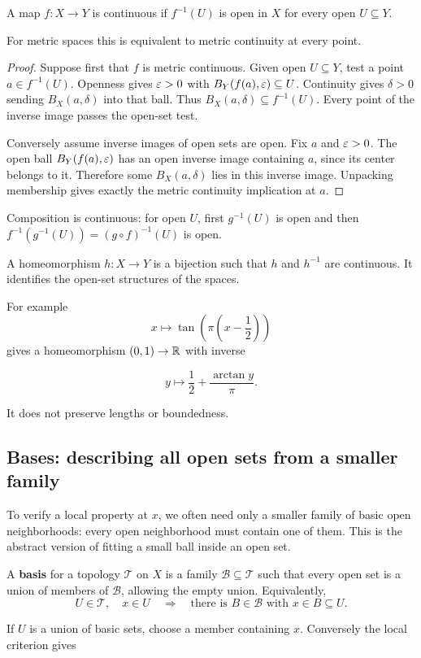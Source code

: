\begin{definition}\label{def:topological-continuity}
A map $f:X\to Y$ is continuous if $f^{-1}(U)$ is open in $X$ for every
open $U\subseteq Y$.
\end{definition}
\begin{theorem}\label{thm:topological-continuity}
For metric spaces this is equivalent to metric continuity at every point.
\end{theorem}
\begin{proof}
Suppose first that $f$ is metric continuous. Given open $U\subseteq Y$,
test a point $a\in f^{-1}(U)$. Openness gives $\varepsilon>0$ with
$B_Y(f(a),\varepsilon)\subseteq U$. Continuity gives $\delta>0$ sending
$B_X(a,\delta)$ into that ball. Thus $B_X(a,\delta)\subseteq f^{-1}(U)$.
Every point of the inverse image passes the open-set test.

Conversely assume inverse images of open sets are open. Fix $a$ and
$\varepsilon>0$. The open ball $B_Y(f(a),\varepsilon)$ has an open inverse image
containing $a$, since its center belongs to it. Therefore some
$B_X(a,\delta)$ lies in this inverse image. Unpacking membership gives
exactly the metric continuity implication at $a$.
\end{proof}
Composition is continuous: for open $U$, first $g^{-1}(U)$ is open and
then $f^{-1}(g^{-1}(U))=(g\circ f)^{-1}(U)$ is open.
\begin{definition}[Homeomorphisms]\label{def:homeomorphism}
A homeomorphism $h:X\to Y$ is a bijection such that $h$ and $h^{-1}$
are continuous. It identifies the open-set structures of the spaces.
\end{definition}
For example
\[
x\mapsto\tan(\pi(x-\frac12))
\]
 gives a homeomorphism
$(0,1)\to\mathbb{R}$ with inverse

\[
y\mapsto\frac12+\frac{\arctan y}{\pi}.
\]

It does not preserve lengths or boundedness.

\subsection{Bases: describing all open sets from a smaller family}
To verify a local property at $x$, we often need only a smaller family of
basic open neighborhoods: every open neighborhood must contain one of them.
This is the abstract version of fitting a small ball inside an open set.
\begin{definition}\label{def:topological-basis}
A \textbf{basis} for a topology $\mathcal T$ on $X$ is a family
$\mathcal B\subseteq\mathcal T$ such that every open set is a union of
members of $\mathcal B$, allowing the empty union. Equivalently,
\[
U\in\mathcal T,\quad x\in U
\quad\Longrightarrow\quad
\text{there is }B\in\mathcal B\text{ with }x\in B\subseteq U.
\]
\end{definition}
If $U$ is a union of basic sets, choose a member containing $x$.
Conversely the local criterion gives

